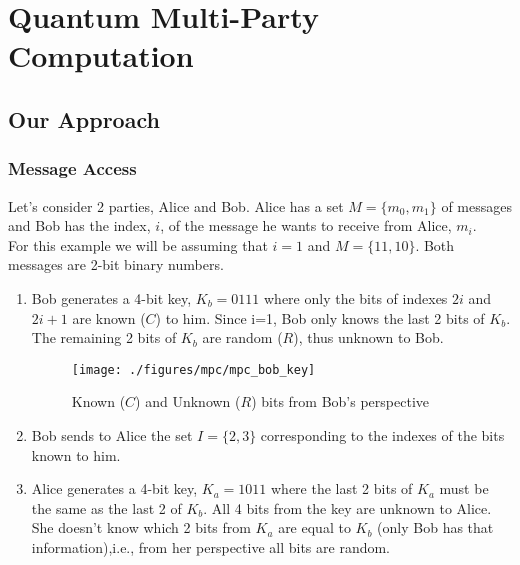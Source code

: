 \section{Quantum Multi-Party Computation}

\begin{refsection}

\subsection{Our Approach}
\subsubsection{Message Access}
Let's consider 2 parties, Alice and Bob. Alice has a set $M = \{m_0,m_1\}$ of messages and Bob has the index, $i$, of the message he wants to receive from Alice, $m_i$.\\
For this example we will be assuming that $i=1$ and $M = \{11,10\}$. Both messages are 2-bit binary numbers.
\begin{enumerate}
\item Bob generates a 4-bit key, $K_b=0111$ where only the bits of indexes $2i$ and $2i+1$ are known ($C$) to him. Since i=1, Bob only knows the last 2 bits of $K_b$. The remaining 2 bits of $K_b$ are random ($R$), thus unknown to Bob.
\renewcommand{\figurename}{Figure}
\begin{figure}[H]
\centering
\texttt{[image: ./figures/mpc/mpc\_bob\_key]}
\caption{Known ($C$) and Unknown ($R$) bits from Bob's perspective }
\label{fig:knownbob}
\end{figure}
\item Bob sends to Alice the set $I = \{2,3\}$ corresponding to the indexes of the bits known to him.
\item Alice generates a 4-bit key, $K_a=1011$ where the last 2 bits of $K_a$ must be the same as the last 2 of $K_b$. All 4 bits from the key
are unknown to Alice. She doesn't know which 2 bits from $K_a$ are equal to $K_b$ (only Bob has that information),i.e., from her perspective
all bits are random.
\renewcommand{\figurename}{Figure}
\begin{figure}[H]

\end{figure}
\end{enumerate}
\end{refsection}
